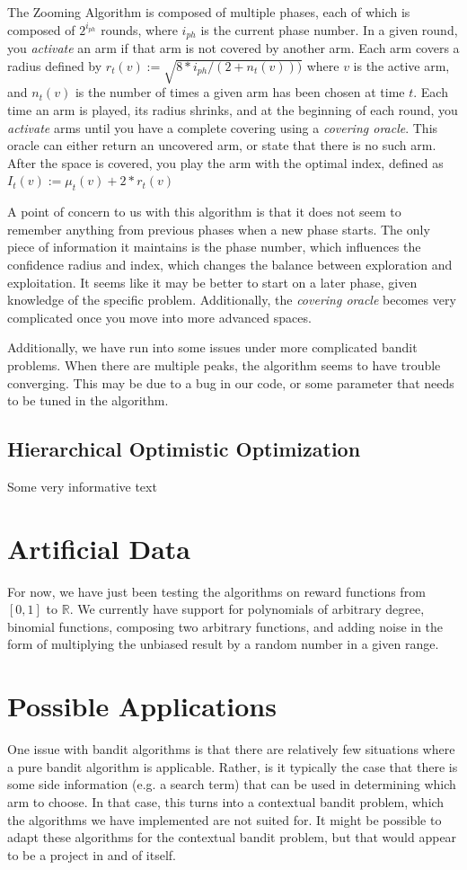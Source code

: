 \documentclass{article}
\begin{document}
The Zooming Algorithm is composed of multiple phases, each of which is composed of $2^{i_{ph}}$ rounds, where $i_{ph}$ is the current phase number. In a given round, you \emph{activate} an arm if that arm is not covered by another arm. Each arm covers a radius defined by $r_t(v):=\sqrt{8*i_{ph}/(2+n_t(v)))}$ where $v$ is the active arm, and $n_t(v)$ is the number of times a given arm has been chosen at time $t$. Each time an arm is played, its radius shrinks, and at the beginning of each round, you \emph{activate} arms until you have a complete covering using a \emph{covering oracle}. This oracle can either return an uncovered arm, or state that there is no such arm. After the space is covered, you play the arm with the optimal index, defined as $I_t(v):=\mu_t(v)+2*r_t(v)$

A point of concern to us with this algorithm is that it does not seem to remember anything from previous phases when a new phase starts. The only piece of information it maintains is the phase number, which influences the confidence radius and index, which changes the balance between exploration and exploitation. It seems like it may be better to start on a later phase, given knowledge of the specific problem. Additionally, the \emph{covering oracle} becomes very complicated once you move into more advanced spaces.

Additionally, we have run into some issues under more complicated bandit problems. When there are multiple peaks, the algorithm seems to have trouble converging. This may be due to a bug in our code, or some parameter that needs to be tuned in the algorithm.
\subsection{Hierarchical Optimistic Optimization}
Some very informative text

\section{Artificial Data}
For now, we have just been testing the algorithms on reward functions from
$[0,1]$ to $\mathbb{R}$.  We currently have support for polynomials
of arbitrary degree, binomial functions, composing two arbitrary functions,
and adding noise in the form of multiplying the unbiased result by a random
number in a given range.
\\
\section{Possible Applications}
One issue with bandit algorithms is that there are relatively few
situations where a pure bandit algorithm is applicable.  Rather, is it
typically the case that there is some side information (e.g. a search term)
that can be used in determining which arm to choose.  In that case, this
turns into a contextual bandit problem, which the algorithms we have
implemented are not suited for.  It might be possible to adapt these
algorithms for the contextual bandit problem, but that would appear to be
a project in and of itself.
\\
\end{document}
